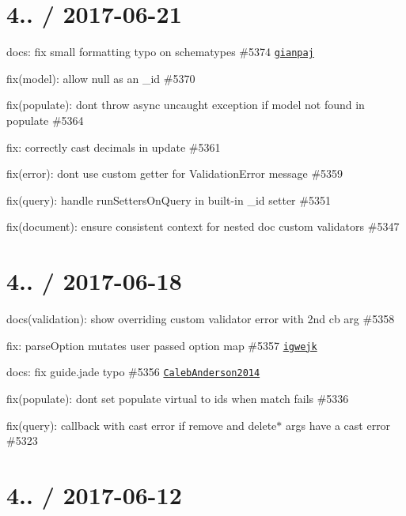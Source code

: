 \section*{4.. / 2017-\/06-\/21 }


\begin{DoxyItemize}
\item docs\+: fix small formatting typo on schematypes \#5374 \href{https://github.com/gianpaj}{\tt gianpaj}
\item fix(model)\+: allow null as an \+\_\+id \#5370
\item fix(populate)\+: don\textquotesingle{}t throw async uncaught exception if model not found in populate \#5364
\item fix\+: correctly cast decimals in update \#5361
\item fix(error)\+: don\textquotesingle{}t use custom getter for Validation\+Error message \#5359
\item fix(query)\+: handle run\+Setters\+On\+Query in built-\/in \+\_\+id setter \#5351
\item fix(document)\+: ensure consistent context for nested doc custom validators \#5347
\end{DoxyItemize}

\section*{4.. / 2017-\/06-\/18 }


\begin{DoxyItemize}
\item docs(validation)\+: show overriding custom validator error with 2nd cb arg \#5358
\item fix\+: {\ttfamily parse\+Option} mutates user passed option map \#5357 \href{https://github.com/igwejk}{\tt igwejk}
\item docs\+: fix guide.\+jade typo \#5356 \href{https://github.com/CalebAnderson2014}{\tt Caleb\+Anderson2014}
\item fix(populate)\+: don\textquotesingle{}t set populate virtual to ids when match fails \#5336
\item fix(query)\+: callback with cast error if remove and delete$\ast$ args have a cast error \#5323
\end{DoxyItemize}

\section*{4.. / 2017-\/06-\/12 }


